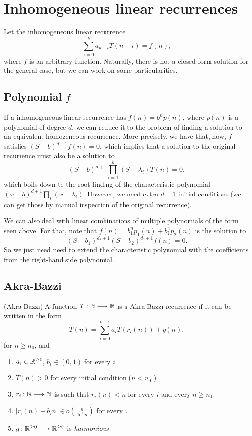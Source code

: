 \section*{Inhomogeneous linear recurrences}

Let the inhomogeneous linear recurrence \[
\sum_{i=0}^{k} a_{k-i}T(n-i) = f(n)
,\] where $f$ is an arbitrary function.
Naturally, there is not a closed form solution for the general case, but we can work on some particularities.

\subsection*{Polynomial $f$}

If a inhomogeneous linear recurrence has $f(n) = b^{n}p(n)$, where $p(n)$ is a polynomial of degree $d$, we can reduce it to the problem of finding a solution to an equivalent homogeneous recurrence.
More precisely, we have that, now, $f$ satisfies $(S-b)^{d+1}f(n) = 0$, which implies that a solution to the original recurrence must also be a solution to \[
    (S-b)^{d+1} \prod_{i=1}^{k} (S-\lambda_i) T(n) = 0 
,\] which boils down to the root-finding of the characteristic polynomial $(x-b)^{d+1} \prod_{i} (x-\lambda_i)$.
However, we need extra $d+1$ initial conditions (we can get those by manual inspection of the original recurrence).

\begin{note}
    We can also deal with linear combinations of multiple polynomials of the form seen above.
    For that, note that $f(n) = b_1^{n}p_1(n) + b_2^{n}p_2(n)$ is the solution to \[
	(S-b_1)^{d_1+1}(S-b_2)^{d_2+1}f(n) = 0
    .\] So we just need need to extend the characteristic polynomial with the coefficients from the right-hand side polynomial.
\end{note}

\subsection*{Akra-Bazzi}


\begin{definition}
    (Akra-Bazzi) A function $T: \mathbb{N} \longrightarrow \mathbb{R}$ is a Akra-Bazzi recurrence if it can be written in the form \[
    T(n) = \sum_{i=0}^{k-1} a_i T(r_i(n)) + g(n)
    ,\] for $n\ge n_0$, and
    \begin{enumerate}
        \item $a_i \in \mathbb{R}^{\ge 0}$, $b_i\in (0,1)$ for every $i$ 
	\item $T(n) > 0$ for every initial condition ($n < n_0$ )
	\item $r_i: \mathbb{N} \longrightarrow \mathbb{N}$ is such that $r_i(n) < n$ for every $i$ and every $n\ge n_0$ 
	\item $|r_i(n) - b_i n| \in o\left( \frac{n}{\ln^2 n} \right) $ for every $i$ 
	\item $g: \mathbb{R}^{\ge 0} \longrightarrow \mathbb{R}^{\ge 0}$ is \emph{harmonious}
    \end{enumerate}
\end{definition}

